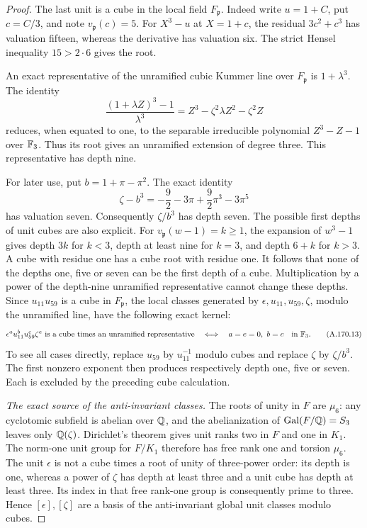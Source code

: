 \begin{proof}
The last unit is a cube in the local field \(F_{\mathfrak p}\).
Indeed write \(u=1+C\), put \(c=C/3\), and note \(v_{\mathfrak p}(c)=5\).
For \(X^3-u\) at \(X=1+c\), the residual
\(3c^2+c^3\) has valuation fifteen, whereas the derivative has
valuation six.  The strict Hensel inequality \(15>2\cdot6\)
gives the root.

An exact representative of the unramified cubic Kummer line over
\(F_{\mathfrak p}\) is
\(1+\lambda^3\).  The identity
\[
 \frac{(1+\lambda Z)^3-1}{\lambda^3}
          =Z^3-\zeta^2\lambda Z^2-\zeta^2Z
\tag{A.170.11}
\]
reduces, when equated to one, to the separable irreducible polynomial
\(Z^3-Z-1\) over \(\mathbb F_3\).
Thus its root gives an unramified extension of degree three.
This representative has depth nine.

For later use, put \(b=1+\pi-\pi^2\).  The exact identity
\[
 \zeta-b^3=-\frac92-3\pi+\frac92\pi^3-3\pi^5
\tag{A.170.12}
\]
has valuation seven.  Consequently \(\zeta/b^3\) has depth seven.
The possible first depths of unit cubes are also explicit.
For \(v_{\mathfrak p}(w-1)=k\ge1\), the expansion of \(w^3-1\) gives
depth \(3k\) for \(k<3\), depth at least nine for \(k=3\),
and depth \(6+k\) for \(k>3\).
A cube with residue one has a cube root with residue one.
It follows that none of the depths one, five or seven can be
the first depth of a cube.  Multiplication by a power of the
depth-nine unramified representative cannot change these depths.
Since \(u_{11}u_{59}\) is a cube in \(F_{\mathfrak p}\), the local classes generated by
\(\epsilon,u_{11},u_{59},\zeta\), modulo the unramified line,
have the following exact kernel:
\[
 \epsilon^a u_{11}^b u_{59}^c\zeta^e
  \text{ is a cube times an unramified representative}
       \quad\Longleftrightarrow\quad
       a=e=0,\ b=c\quad\text{in }\mathbb F_3.
\tag{A.170.13}
\]
To see all cases directly, replace \(u_{59}\) by \(u_{11}^{-1}\)
modulo cubes and replace \(\zeta\) by \(\zeta/b^3\).
The first nonzero exponent then produces respectively depth
one, five or seven.  Each is excluded by the preceding cube
calculation.

\emph{The exact source of the anti-invariant classes.}
The roots of unity in \(F\) are \(\mu_6\): any cyclotomic subfield
is abelian over \(\mathbb Q\), and the abelianization of
\(\operatorname{Gal}(F/\mathbb Q)=S_3\) leaves only \(\mathbb Q(\zeta)\).
Dirichlet's theorem gives unit ranks two in \(F\) and one in
\(K_1\).  The norm-one unit group for \(F/K_1\) therefore has
free rank one and torsion \(\mu_6\).
The unit \(\epsilon\) is not a cube times a root of unity of
three-power order: its depth is one, whereas a power of \(\zeta\)
has depth at least three and a unit cube has depth at least three.
Its index in that free rank-one group is consequently prime to
three.  Hence \([\epsilon],[\zeta]\) are a basis of the
anti-invariant global unit classes modulo cubes.


\end{proof}
